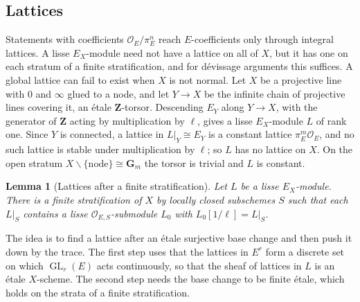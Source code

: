 \documentclass[11pt,a4paper]{article}
\numberwithin{equation}{section}
\newtheorem{lemma}[theorem]{Lemma}
\theoremstyle{definition}
\theoremstyle{remark}
\DeclareMathOperator{\GL}{GL}
\begin{document}
\subsection{Lattices}

Statements with coefficients $\mathcal O_E/\pi_E^n$ reach $E$-coefficients
only through integral lattices. A lisse $E_X$-module need not have a
lattice on all of $X$, but it has one on each stratum of a finite
stratification, and for d\'evissage arguments this suffices.
A global lattice can fail to exist when $X$ is not normal. Let $X$ be a
projective line with $0$ and $\infty$ glued to a node, and let $Y\to X$
be the infinite chain of projective lines covering it, an \'etale
$\mathbf Z$-torsor. Descending $E_Y$ along $Y\to X$, with the generator
of $\mathbf Z$ acting by multiplication by $\ell$, gives a lisse
$E_X$-module $L$ of rank one. Since $Y$ is connected, a lattice in
$L|_Y\cong E_Y$ is a constant lattice $\pi_E^m\mathcal O_E$, and no such
lattice is stable under multiplication by $\ell$; so $L$ has no lattice
on $X$. On the open stratum $X\smallsetminus\{\text{node}\}\cong\mathbf G_m$
the torsor is trivial and $L$ is constant.

\begin{lemma}[Lattices after a finite stratification]
\label{b:lem:stratified-lattice}
Let $L$ be a lisse $E_X$-module. There is a finite stratification of $X$
by locally closed subschemes $S$ such that each $L|_S$ contains a lisse
$\mathcal O_{E,S}$-submodule $L_0$ with $L_0[1/\ell]=L|_S$.
\end{lemma}

The idea is to find a lattice after an \'etale surjective base change and
then push it down by the trace. The first step uses that the lattices in
$E^r$ form a discrete set on which $\GL_r(E)$ acts continuously, so that
the sheaf of lattices in $L$ is an \'etale $X$-scheme. The second step
needs the base change to be finite \'etale, which holds on the strata of
a finite stratification.
\end{document}
